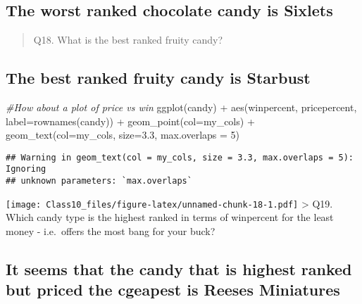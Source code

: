 \documentclass[
]{article}
\newenvironment{Shaded}{\begin{snugshade}}{\end{snugshade}}
\newcommand{\AttributeTok}[1]{\textcolor[rgb]{0.77,0.63,0.00}{#1}}
\newcommand{\CommentTok}[1]{\textcolor[rgb]{0.56,0.35,0.01}{\textit{#1}}}
\newcommand{\DecValTok}[1]{\textcolor[rgb]{0.00,0.00,0.81}{#1}}
\newcommand{\FloatTok}[1]{\textcolor[rgb]{0.00,0.00,0.81}{#1}}
\newcommand{\FunctionTok}[1]{\textcolor[rgb]{0.00,0.00,0.00}{#1}}
\newcommand{\NormalTok}[1]{#1}
\newcommand{\SpecialCharTok}[1]{\textcolor[rgb]{0.00,0.00,0.00}{#1}}
\begin{document}
\hypertarget{the-worst-ranked-chocolate-candy-is-sixlets}{%
\subsection{The worst ranked chocolate candy is
Sixlets}\label{the-worst-ranked-chocolate-candy-is-sixlets}}

\begin{quote}
Q18. What is the best ranked fruity candy?
\end{quote}

\hypertarget{the-best-ranked-fruity-candy-is-starbust}{%
\subsection{The best ranked fruity candy is
Starbust}\label{the-best-ranked-fruity-candy-is-starbust}}

\begin{Shaded}
\begin{Highlighting}[]
\CommentTok{\#How about a plot of price vs win}
\FunctionTok{ggplot}\NormalTok{(candy) }\SpecialCharTok{+}
  \FunctionTok{aes}\NormalTok{(winpercent, pricepercent, }\AttributeTok{label=}\FunctionTok{rownames}\NormalTok{(candy)) }\SpecialCharTok{+}
  \FunctionTok{geom\_point}\NormalTok{(}\AttributeTok{col=}\NormalTok{my\_cols) }\SpecialCharTok{+} 
  \FunctionTok{geom\_text}\NormalTok{(}\AttributeTok{col=}\NormalTok{my\_cols, }\AttributeTok{size=}\FloatTok{3.3}\NormalTok{, }\AttributeTok{max.overlaps =} \DecValTok{5}\NormalTok{)}
\end{Highlighting}
\end{Shaded}

\begin{verbatim}
## Warning in geom_text(col = my_cols, size = 3.3, max.overlaps = 5): Ignoring
## unknown parameters: `max.overlaps`
\end{verbatim}

\texttt{[image: Class10\_files/figure-latex/unnamed-chunk-18-1.pdf]}
\textgreater{} Q19. Which candy type is the highest ranked in terms of
winpercent for the least money - i.e.~offers the most bang for your
buck?

\hypertarget{it-seems-that-the-candy-that-is-highest-ranked-but-priced-the-cgeapest-is-reeses-miniatures}{%
\subsection{It seems that the candy that is highest ranked but priced
the cgeapest is Reeses
Miniatures}\label{it-seems-that-the-candy-that-is-highest-ranked-but-priced-the-cgeapest-is-reeses-miniatures}}
\end{document}
